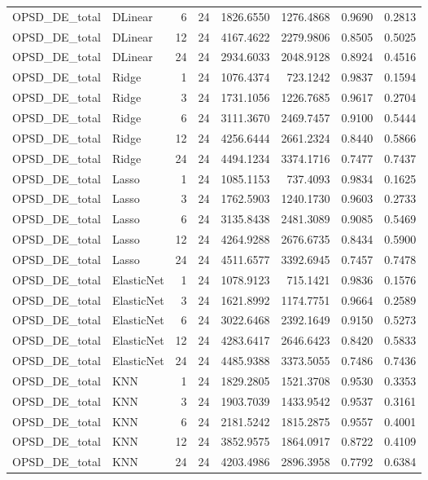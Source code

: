\begin{tabular}{llrrrrrr}
OPSD_DE_total & DLinear & 6 & 24 & 1826.6550 & 1276.4868 & 0.9690 & 0.2813 \\
OPSD_DE_total & DLinear & 12 & 24 & 4167.4622 & 2279.9806 & 0.8505 & 0.5025 \\
OPSD_DE_total & DLinear & 24 & 24 & 2934.6033 & 2048.9128 & 0.8924 & 0.4516 \\
OPSD_DE_total & Ridge & 1 & 24 & 1076.4374 & 723.1242 & 0.9837 & 0.1594 \\
OPSD_DE_total & Ridge & 3 & 24 & 1731.1056 & 1226.7685 & 0.9617 & 0.2704 \\
OPSD_DE_total & Ridge & 6 & 24 & 3111.3670 & 2469.7457 & 0.9100 & 0.5444 \\
OPSD_DE_total & Ridge & 12 & 24 & 4256.6444 & 2661.2324 & 0.8440 & 0.5866 \\
OPSD_DE_total & Ridge & 24 & 24 & 4494.1234 & 3374.1716 & 0.7477 & 0.7437 \\
OPSD_DE_total & Lasso & 1 & 24 & 1085.1153 & 737.4093 & 0.9834 & 0.1625 \\
OPSD_DE_total & Lasso & 3 & 24 & 1762.5903 & 1240.1730 & 0.9603 & 0.2733 \\
OPSD_DE_total & Lasso & 6 & 24 & 3135.8438 & 2481.3089 & 0.9085 & 0.5469 \\
OPSD_DE_total & Lasso & 12 & 24 & 4264.9288 & 2676.6735 & 0.8434 & 0.5900 \\
OPSD_DE_total & Lasso & 24 & 24 & 4511.6577 & 3392.6945 & 0.7457 & 0.7478 \\
OPSD_DE_total & ElasticNet & 1 & 24 & 1078.9123 & 715.1421 & 0.9836 & 0.1576 \\
OPSD_DE_total & ElasticNet & 3 & 24 & 1621.8992 & 1174.7751 & 0.9664 & 0.2589 \\
OPSD_DE_total & ElasticNet & 6 & 24 & 3022.6468 & 2392.1649 & 0.9150 & 0.5273 \\
OPSD_DE_total & ElasticNet & 12 & 24 & 4283.6417 & 2646.6423 & 0.8420 & 0.5833 \\
OPSD_DE_total & ElasticNet & 24 & 24 & 4485.9388 & 3373.5055 & 0.7486 & 0.7436 \\
OPSD_DE_total & KNN & 1 & 24 & 1829.2805 & 1521.3708 & 0.9530 & 0.3353 \\
OPSD_DE_total & KNN & 3 & 24 & 1903.7039 & 1433.9542 & 0.9537 & 0.3161 \\
OPSD_DE_total & KNN & 6 & 24 & 2181.5242 & 1815.2875 & 0.9557 & 0.4001 \\
OPSD_DE_total & KNN & 12 & 24 & 3852.9575 & 1864.0917 & 0.8722 & 0.4109 \\
OPSD_DE_total & KNN & 24 & 24 & 4203.4986 & 2896.3958 & 0.7792 & 0.6384 \\

\end{tabular}

